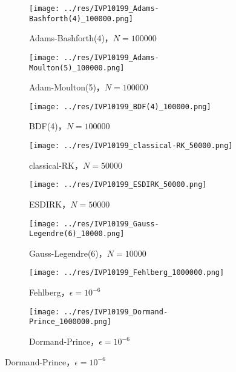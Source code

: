 \documentclass[lang=cn,a4paper,newtx,bibend=bibtex]{elegantpaper}
\begin{document}
\begin{figure}[H]
    \centering
    \begin{subfigure}[b]{0.2\textwidth}
        \texttt{[image: ../res/IVP10199\_Adams-Bashforth(4)\_100000.png]}
        \caption{Adams-Bashforth(4)，$N=100000$}
    \end{subfigure}
    \hfill
    \begin{subfigure}[b]{0.2\textwidth}
        \texttt{[image: ../res/IVP10199\_Adams-Moulton(5)\_100000.png]}
        \caption{Adam-Moulton(5)，$N=100000$}
    \end{subfigure}
    \hfill
    \begin{subfigure}[b]{0.2\textwidth}
        \texttt{[image: ../res/IVP10199\_BDF(4)\_100000.png]}
        \caption{BDF(4)，$N=100000$}
    \end{subfigure}
    \hfill
    \begin{subfigure}[b]{0.2\textwidth}
        \texttt{[image: ../res/IVP10199\_classical-RK\_50000.png]}
        \caption{classical-RK，$N=50000$}
    \end{subfigure}
    \begin{subfigure}[b]{0.2\textwidth}
        \texttt{[image: ../res/IVP10199\_ESDIRK\_50000.png]}
        \caption{ESDIRK，$N=50000$}
    \end{subfigure}
    \hfill
    \begin{subfigure}[b]{0.2\textwidth}
        \texttt{[image: ../res/IVP10199\_Gauss-Legendre(6)\_10000.png]}
        \caption{Gauss-Legendre(6)，$N=10000$}
    \end{subfigure}
    \hfill
    \begin{subfigure}[b]{0.2\textwidth}
        \texttt{[image: ../res/IVP10199\_Fehlberg\_1000000.png]}
        \caption{Fehlberg，$\epsilon=10^{-6}$}
    \end{subfigure}
    \hfill
    \begin{subfigure}[b]{0.2\textwidth}
        \texttt{[image: ../res/IVP10199\_Dormand-Prince\_1000000.png]}
        \caption{Dormand-Prince，$\epsilon=10^{-6}$}
    \end{subfigure}
\end{figure}
\end{document}
